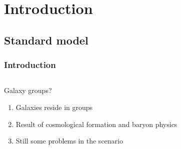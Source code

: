 \section{Introduction}
\subsection{Standard model}

\begin{frame}
    \frametitle{Introduction}

    \centering
    \begin{columns}
        \centering
        \begin{column}{0.5\textwidth}
            \begin{minipage}[c][0.6\textheight][c]{\linewidth}
                \begin{block}{Galaxy groups?}
                    \begin{enumerate}
                        \item<1-> Galaxies reside in groups
                        \item<2-> Result of cosmological formation and baryon
                            physics
                        \item<3-> Still some problems in the scenario
                    \end{enumerate}
                \end{block}
            \end{minipage}
        \end{column}
        \begin{column}{0.5\textwidth}
            \begin{minipage}[c][0.6\textheight][c]{\linewidth}
            \end{minipage}
        \end{column}
    \end{columns}
\end{frame}

